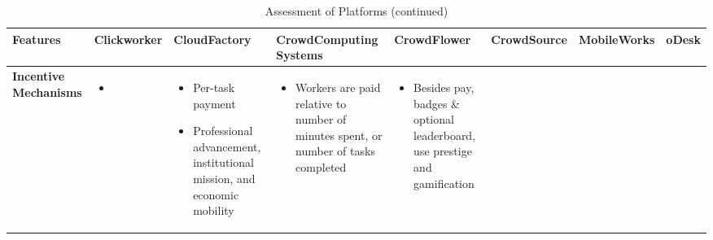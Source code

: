 \documentclass{sigchi}
\begin{document}
\begin{sidewaystable*}
\tiny
    \centering
    \caption{Assessment of Platforms (continued)}
\begin{tabular}[h]{| p{1.5cm}| p{2.7cm}| p{2.7cm}| p{2.7cm}| p{2.7cm}| p{2.7cm}| p{2.7cm}| p{2.7cm}|}
\hline
{\bf Features} & {\bf Clickworker} &{\bf CloudFactory} & {\bf CrowdComputing Systems} &{\bf CrowdFlower} &{\bf CrowdSource} &{\bf MobileWorks} &{\bf oDesk} \\ 
\hline


 

{\bf Incentive Mechanisms
} & 
{
\begin{itemize} [noitemsep,nolistsep]
\item  \10
\end{itemize}
} &
{
\begin{itemize} [noitemsep,nolistsep]
\item  Per-task payment

\item  Professional advancement, institutional mission, and economic mobility
\end{itemize}
} &
{
\begin{itemize} [noitemsep,nolistsep]
\item  Workers are paid relative to number of minutes spent, or number of tasks completed
\end{itemize}
} &
{
\begin{itemize} [noitemsep,nolistsep]
\item  Besides pay, badges \& optional leaderboard, use prestige and gamification


\end{itemize}}
\end{tabular}
\end{sidewaystable*}
\end{document}

